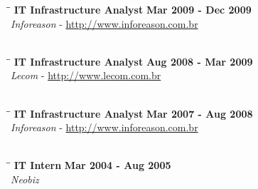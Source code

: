 \documentclass[margin]{res}
\begin{document}
\begin{resume}
\vspace{-0.1in}
\begin{tabbing}
  \hspace{2.3in}\= \hspace{1.7in}\= \kill %
  \textbf{IT Infrastructure Analyst}    \>\>\textbf{Mar 2009 - Dec 2009}\\
  \textit{Inforeason} - \url{http://www.inforeason.com.br}\\\\
\end{tabbing}\vspace{-20pt}      %


\vspace{-0.1in}
\begin{tabbing}
  \hspace{2.3in}\= \hspace{1.7in}\= \kill %
  \textbf{IT Infrastructure Analyst}    \>\>\textbf{Aug 2008 - Mar 2009}\\
  \textit{Lecom} - \url{http://www.lecom.com.br}\\\\
\end{tabbing}\vspace{-20pt}      %

\vspace{-0.1in}
\begin{tabbing}
  \hspace{2.3in}\= \hspace{1.7in}\= \kill %
  \textbf{IT Infrastructure Analyst}    \>\>\textbf{Mar 2007 - Aug 2008}\\
  \textit{Inforeason} - \url{http://www.inforeason.com.br}\\\\
\end{tabbing}\vspace{-20pt}      %

\vspace{-0.1in}
\begin{tabbing}
  \hspace{2.3in}\= \hspace{1.7in}\= \kill %
  \textbf{IT Intern}    \>\>\textbf{Mar 2004 - Aug 2005}\\
  \textit{Neobiz} \\\\
\end{tabbing}\vspace{-20pt}      %



\end{resume}
\end{document}
